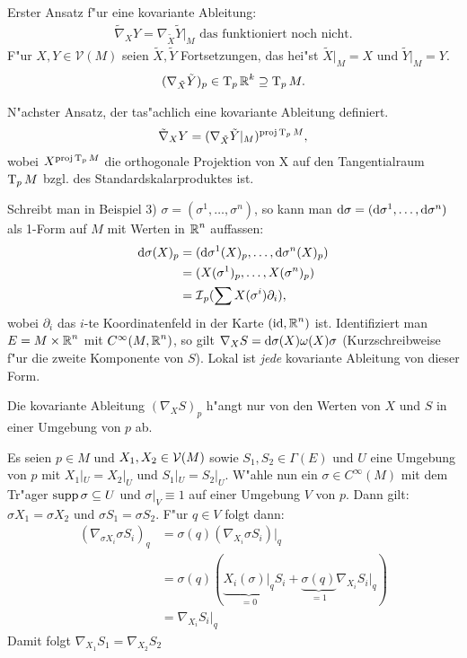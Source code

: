 \begin{bsp}
\begin{enumerate}[label=(\arabic*),leftmargin=*]
    Erster Ansatz f"ur eine kovariante Ableitung:
    \begin{align*}
      \tilde \nabla_XY = \nabla_{\tilde X}\tilde Y|_M \text{ das funktioniert noch nicht.}
    \end{align*}
    F"ur $X,Y \in \mathcal V(M)$ seien $\tilde X, \tilde Y$ Fortsetzungen, das hei"st $\tilde X|_M = X$ und $\tilde Y|_M = Y$.
    \begin{align*}
      (\nabla_{\tilde X}\tilde Y)_p \in \operatorname{T}_p\operatorname{\mathbb{R}}^k \supseteq \operatorname{T}_pM.
    \end{align*}

    N"achster Ansatz, der tas"achlich eine kovariante Ableitung definiert.
    \begin{align*}
      \tilde \nabla_XY = (\nabla_{\tilde X}\tilde Y|_M)^{\text{proj}\operatorname{T}_pM},
    \end{align*}
    wobei $X^{\text{proj}\operatorname{T}_pM}$ die orthogonale Projektion von X auf den Tangentialraum $\operatorname{T}_pM$ bzgl. des Standardskalarproduktes ist.
  \end{enumerate}
\end{bsp}

Schreibt man in Beispiel 3) $\sigma = ( \sigma^1, \ldots ,\sigma^n)$, so kann man $\mathrm{d} \sigma = (\mathrm{d} \sigma^1,\ldots ,\mathrm{d}\sigma^n)$ als 1-Form auf $M$ mit Werten in $\operatorname{\mathbb{R}}^n$ auffassen:
\begin{align*}
  \mathrm{d} \sigma(X)_p &= (\mathrm{d} \sigma^1(X)_p,\ldots , \mathrm{d} \sigma^n(X)_p)\\
  &= (X(\sigma^1)_p,\ldots ,X(\sigma^n)_p)\\
  &= \operatorname{\mathcal{I}}_p(\sum X(\sigma^{i}) \partial_i),
\end{align*}
wobei $\partial_i$ das $i$-te Koordinatenfeld in der Karte $(\operatorname{id}, \operatorname{\mathbb{R}}^n)$ ist.
Identifiziert man $E = M \times \operatorname{\mathbb{R}}^n$ mit $C^{\infty}(M, \operatorname{\mathbb{R}}^n)$, so gilt $\nabla_X S = \mathrm{d} \sigma(X) \omega(X) \sigma$ (Kurzschreibweise f"ur die zweite Komponente von $S$). 
Lokal ist \emph{jede} kovariante Ableitung von dieser Form.

\begin{Lemma}
  Die kovariante Ableitung $(\nabla_XS)_p$ h"angt nur von den Werten von $X$ und $S$ in einer Umgebung von $p$ ab.
\end{Lemma}

\begin{bew}
  Es seien $p \in M$ und $X_1, X_2 \in \operatorname{\mathcal{V}}(M)$ sowie $S_1, S_2 \in \Gamma(E)$ und $U$ eine Umgebung von $p$ mit $X_1|_U = X_2|_U$ und $S_1|_U = S_2|_U$. 
  W"ahle nun ein $\sigma \in C^{\infty}(M)$ mit dem Tr"ager $\operatorname{supp} \sigma \subseteq U$ und $\sigma|_V \equiv 1$ auf einer Umgebung $V$ von $p$.
  Dann gilt: $\sigma X_1 = \sigma X_2$ und $\sigma S_1 = \sigma S_2$. F"ur $q \in V$ folgt dann:
  \begin{align*}
    (\nabla_{\sigma X_i} \sigma S_i)_q &= \sigma(q)(\nabla_{X_i} \sigma S_i)|_q\\
    &= \sigma(q)(\underbrace{X_i(\sigma)|_q}_{=0} S_i + \underbrace{\sigma(q)}_{=1}\nabla_{X_i} S_i|_q)\\
    &= \nabla_{X_i} S_i|_q
  \end{align*}
  Damit folgt $\nabla_{X_1} S_1 = \nabla_{X_2} S_2$
\end{bew}


